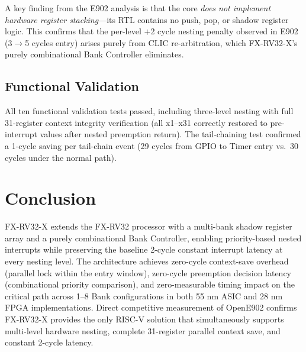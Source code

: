 \documentclass[conference]{IEEEtran}
\begin{document}
A key finding from the E902 analysis is that the core \emph{does not implement hardware register stacking}—its RTL contains no push, pop, or shadow register logic.
This confirms that the per-level $+$2 cycle nesting penalty observed in E902 (3$\rightarrow$5 cycles entry) arises purely from CLIC re-arbitration, which FX-RV32-X's purely combinational Bank Controller eliminates.

\subsection{Functional Validation}

All ten functional validation tests passed, including three-level nesting with full 31-register context integrity verification (all x1--x31 correctly restored to pre-interrupt values after nested preemption return).
The tail-chaining test confirmed a 1-cycle saving per tail-chain event (29 cycles from GPIO to Timer entry vs.\ 30 cycles under the normal path).

\section{Conclusion}

FX-RV32-X extends the FX-RV32 processor with a multi-bank shadow register array and a purely combinational Bank Controller, enabling priority-based nested interrupts while preserving the baseline 2-cycle constant interrupt latency at every nesting level.
The architecture achieves zero-cycle context-save overhead (parallel lock within the entry window), zero-cycle preemption decision latency (combinational priority comparison), and zero-measurable timing impact on the critical path across 1--8 Bank configurations in both 55 nm ASIC and 28 nm FPGA implementations.
Direct competitive measurement of OpenE902 confirms FX-RV32-X provides the only RISC-V solution that simultaneously supports multi-level hardware nesting, complete 31-register parallel context save, and constant 2-cycle latency.
\end{document}
